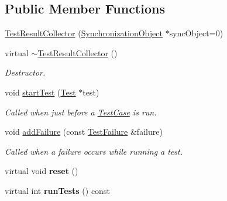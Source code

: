 \subsection*{Public Member Functions}
\begin{DoxyCompactItemize}
\item 
\hyperlink{class_test_result_collector_a8bc475c91000fca9f0ed34e105577767}{Test\-Result\-Collector} (\hyperlink{class_synchronized_object_1_1_synchronization_object}{Synchronization\-Object} $\ast$sync\-Object=0)
\item 
\hypertarget{class_test_result_collector_a2e905ace0bcb819bbe190faf16ea1aed}{virtual \hyperlink{class_test_result_collector_a2e905ace0bcb819bbe190faf16ea1aed}{$\sim$\-Test\-Result\-Collector} ()}\label{class_test_result_collector_a2e905ace0bcb819bbe190faf16ea1aed}

\begin{DoxyCompactList}\small\item\em Destructor. \end{DoxyCompactList}\item 
\hypertarget{class_test_result_collector_a647d3e05ffc8fcf7023fea2f7c9f95cb}{void \hyperlink{class_test_result_collector_a647d3e05ffc8fcf7023fea2f7c9f95cb}{start\-Test} (\hyperlink{class_test}{Test} $\ast$test)}\label{class_test_result_collector_a647d3e05ffc8fcf7023fea2f7c9f95cb}

\begin{DoxyCompactList}\small\item\em Called when just before a \hyperlink{class_test_case}{Test\-Case} is run. \end{DoxyCompactList}\item 
void \hyperlink{class_test_result_collector_af53cbc55621f0eb0dc02d8b0203ea321}{add\-Failure} (const \hyperlink{class_test_failure}{Test\-Failure} \&failure)
\begin{DoxyCompactList}\small\item\em Called when a failure occurs while running a test. \end{DoxyCompactList}\item 
\hypertarget{class_test_result_collector_a1e20981cc1e127942154a643639d4740}{virtual void {\bfseries reset} ()}\label{class_test_result_collector_a1e20981cc1e127942154a643639d4740}

\item 
\hypertarget{class_test_result_collector_ac832652158423deae9c2815ba616e836}{virtual int {\bfseries run\-Tests} () const }\label{class_test_result_collector_ac832652158423deae9c2815ba616e836}


\end{DoxyCompactItemize}
